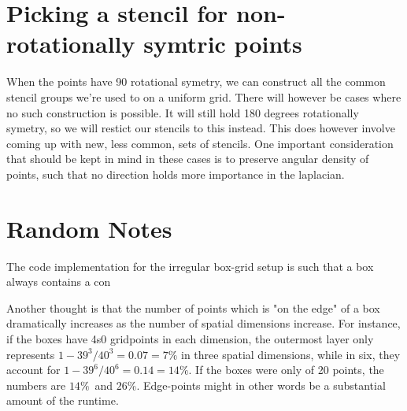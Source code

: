 \documentclass[12p,a4paper]{article}
\begin{document}
\section{Picking a stencil for non-rotationally symtric points}
When the points have 90 rotational symetry, we can construct all the common stencil groups we're used to on a uniform grid. There will however be cases where no such construction is possible. It will still hold 180 degrees rotationally symetry, so we will restict our stencils to this instead. This does however involve coming up with new, less common, sets of stencils. One important consideration that should be kept in mind in these cases is to preserve angular density of points, such that no direction holds more importance in the laplacian.



\section{Random Notes}
The code implementation for the irregular box-grid setup is such that a box always contains a con

Another thought is that the number of points which is "on the edge" of a box dramatically increases as the number of spatial dimensions increase. For instance, if the boxes have 4s0 gridpoints in each dimension, the outermost layer only represents $1-39^3/40^3 = 0.07 = 7\%$ in three spatial dimensions, while in six, they account for $1-39^6/40^6 = 0.14 = 14\%$. If the boxes were only of 20 points, the numbers are $14\%$ and $26\%$. Edge-points might in other words be a substantial amount of the runtime.    
\end{document}
